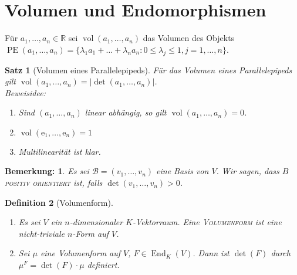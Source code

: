 \documentclass{report}
\newcommand{\IN}[1]{\index{#1|BH}}
\newcommand{\lb}{\lambda}
\newcommand{\ee}{\mathrm{e}}
\newcommand{\R}{\mathbb{R}}
\newcommand{\baseb}{\mathcal{B}}
\DeclareMathOperator{\End}{End}
\DeclareMathOperator{\vol}{vol}
\DeclareMathOperator{\PE}{PE}
\theoremstyle{customrem}
\newtheorem*{bemerkung}{Bemerkung\textnormal:}
\theoremstyle{customdef}
\newtheorem{definition}{Definition}[chapter]
\newtheorem{satz}[definition]{Satz}
\theoremstyle{customenv}
\newcommand{\defemph}[1]{\textsc{#1}}
\begin{document}
\section{Volumen und Endomorphismen}
Für \(a_1,\ldots, a_n\in\R\) sei \(\vol(a_1,\ldots, a_n)\) das Volumen des Objekts \(\PE(a_1,\ldots, a_n) = \{\lb_1a_1+\ldots+\lb_na_n:0\leq\lb_j\leq1,j=1,\ldots,n\}\).

	\begin{satz}[Volumen eines Parallelepipeds]
		Für das Volumen eines Parallelepipeds gilt \(\vol(a_1,\ldots, a_n) = |\det(a_1,\ldots, a_n)|\).\\
		
		\pagebreak[2]\textit{Beweisidee}:
		\begin{enumerate}[label = \roman*)]
			\item Sind \((a_1,\ldots, a_n)\) linear abhängig, so gilt \(\vol(a_1,\ldots, a_n) = 0\).
			\item \(\vol(\ee_1,\ldots, \ee_n) = 1\)
			\item Multilinearität ist klar.
		\end{enumerate}
	\end{satz}
	
\begin{bemerkung}
	Es sei \(\baseb = (v_1,\ldots, v_n)\) eine Basis von \(V\). Wir sagen, dass \(B\) \defemph{positiv orientiert} ist, falls \(\det(v_1,\ldots, v_n) > 0\).
\end{bemerkung}

	\begin{definition}[Volumenform]\( \)\vspace{-.5cm} %
		\IN{Volumenform}
		\begin{enumerate}[label = \roman*)]
			\item Es sei \(V\) ein \(n\)-dimensionaler \(K\)-Vektorraum. Eine \defemph{Volumenform} ist eine nicht-triviale \(n\)-Form auf \(V\).
			\item Sei \(\mu\) eine Volumenform auf \(V\), \(F\in\End_K(V)\). Dann ist \(\det(F)\) durch \(\mu^F = \det(F)\cdot\mu\) definiert.
		\end{enumerate}
	\end{definition}
	
\end{document}
